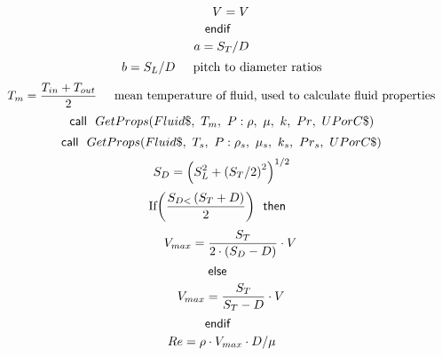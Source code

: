 \documentclass[10pt,fleqn]{article}
\newcommand{\F}[1]{\mbox{$#1$}}
\newcommand{\K}[1]{\mbox{\sf#1\ \ \mit}}
\newcommand{\KS}[1]{\mbox{\sf\ \ #1\ \ \mit}}
\newcommand{\V}[1]{\mbox{$ #1 $}}
\newcommand{\I}{\mbox{\hspace{0.20in}}}
\begin{document}
\begin{equation}
\I \I \label{EES Eqn:232}
V=V 
\end{equation}
\begin{equation}
\I \label{EES Eqn:233}
\K{endif} 
\end{equation}
\begin{equation}
\I \label{EES Eqn:234}
a=S_{T}/D 
\end{equation}
\begin{equation}
\I \label{EES Eqn:235}
b=S_{L}/\V{D	} 
\mbox{\I pitch to diameter ratios}
\end{equation}
\begin{equation}
\I \label{EES Eqn:236}
T_{m}=\frac {T_{in}+T_{out}}{ 2	 } 
\mbox{\I mean temperature of fluid, used to calculate fluid properties}
\end{equation}
\begin{equation}
\I \label{EES Eqn:237}
\K{call} \F{GetProps}{ \left( Fluid\$,\ T_{m},\ P: \rho,\ \mu,\ k,\ \V{Pr} ,\ UPorC\$ \right) } 
\end{equation}
\begin{equation}
\I \label{EES Eqn:238}
\K{call} \F{GetProps}{ \left( Fluid\$,\ T_{s},\ P: \rho_{s},\ \mu_{s},\ k_{s},\ \V{Pr} _{s},\ UPorC\$ \right) } 
\end{equation}
\begin{equation}
\I \label{EES Eqn:239}
S_{D}= \left( S_{L}^{2}+ \left( S_{T}/2 \right) ^{2} \right) ^{1/2} 
\end{equation}
\begin{equation}
\I \label{EES Eqn:240}
\mbox{If}{ \left( \frac {S_{D<} \left( S_{T}+D \right) }{ 2 } \right) } \KS{then} 
\end{equation}
\begin{equation}
\I \I \label{EES Eqn:241}
V_{max}=\frac {S_{T}}{ 2\cdot  \left( S_{D}-D \right)  }\cdot V 
\end{equation}
\begin{equation}
\I \label{EES Eqn:242}
\K{else} 
\end{equation}
\begin{equation}
\I \I \label{EES Eqn:243}
V_{max}=\frac {S_{T}}{ S_{T}-D }\cdot V 
\end{equation}
\begin{equation}
\I \label{EES Eqn:244}
\K{endif} 
\end{equation}
\begin{equation}
\I \label{EES Eqn:245}
\V{Re} =\rho\cdot V_{max}\cdot D/\mu 
\end{equation}
\end{document}
